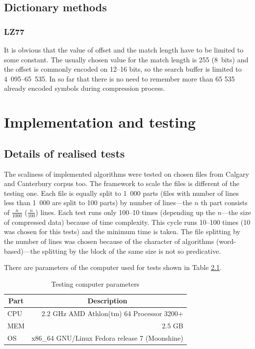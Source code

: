 \documentclass[thesis=M,english]{FITthesis}[2012/10/20]
\begin{document}
\section{Dictionary methods}

	\subsection{LZ77}
It is obvious that the value of offset and the match length have to be limited to some constant. The usually chosen value for the match length is 255 (8~bits) and the offset is commonly encoded on 12--16 bits, so the search buffer is limited to 4~095--65~535. In so far that there is no need to remember more than 65 535 already encoded symbols during compression process.

\chapter{Implementation and testing}\label{impltest}

\section{Details of realised tests}

The scaliness of implemented algorithms were tested on chosen files from Calgary and Canterbury corpus too. The framework to scale the files is different of the testing one. Each file is equally split to 1~000 parts (files with number of lines less than 1~000 are split to 100 parts) by number of lines---the $n$ th part consists of $\frac{n}{1000}$ ($\frac{n}{100}$) lines. Each test runs only 100--10 times (depending up the $n$---the size of compressed data) because of time complexity. This cycle runs 10--100 times (10 was chosen for this tests) and the minimum time is taken. The file splitting by the number of lines was chosen because of the character of algorithms (word-based)---the splitting by the block of the same size is not so predicative.

There are parameters of the computer used for tests shown in Table \ref{tab:PCparam}.
\begin{table}\centering
	\caption{Testing computer parameters}
	\label{tab:PCparam}
	\begin{tabular}{|l|r|}
	\hline \multicolumn{1}{|c|}{\textbf{Part}} & \multicolumn{1}{|c|}{\textbf{Description}} \\\hline
	CPU & 2.2 GHz AMD Athlon(tm) 64 Processor 3200+\\
	MEM & 2.5 GB\\
	OS & x86\_64 GNU/Linux Fedora release 7 (Moonshine)\\\hline
	\end{tabular}
\end{table}
\end{document}
